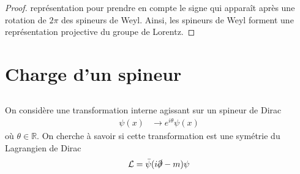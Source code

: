 \documentclass{article}
\numberwithin{equation}{section}
\theoremstyle{solution}
\begin{document}
\begin{proof}
représentation pour prendre en compte le signe qui apparaît après une rotation de $2\pi$ des spineurs de Weyl.
Ainsi, les spineurs de Weyl forment une représentation projective du groupe de Lorentz.
\end{proof}

\section{Charge d’un spineur}
\subsection{}
On considère une transformation interne agissant sur un spineur de Dirac
\begin{equation}\label{eq:t_interne}
	\begin{split}
		\psi(x) &\rightarrow e^{i\theta}\psi(x)
	\end{split}
\end{equation} 
où $\theta \in \mathbb{R}$. On cherche à savoir si cette transformation est une symétrie du Lagrangien de Dirac
\begin{equation}\label{eq:dirac_L}
	\mathcal{L} = \bar{\psi}(i \slashed{\partial} - m)\psi
\end{equation} 
\end{document}
